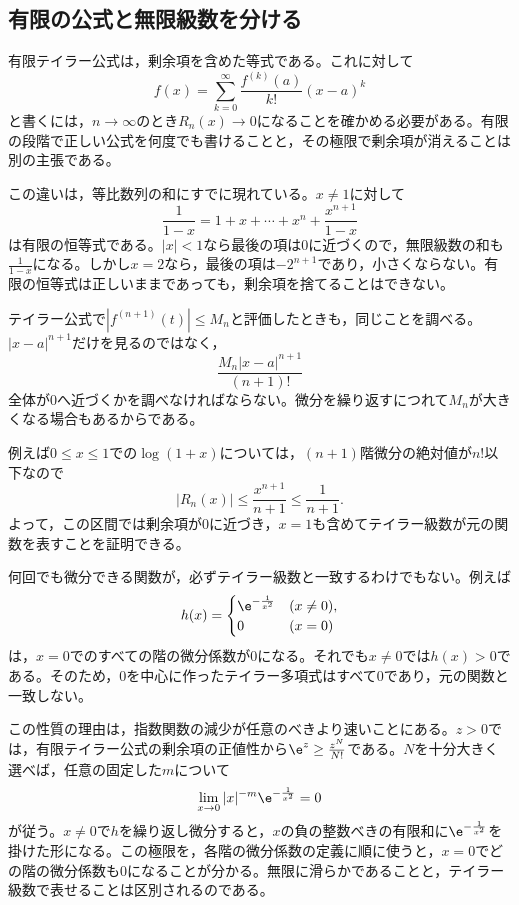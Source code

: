 \subsection{有限の公式と無限級数を分ける}

有限テイラー公式は，剰余項を含めた等式である。これに対して
\[
 f(x)=\sum_{k=0}^{\infty}\frac{f^{(k)}(a)}{k!}(x-a)^k
\]
と書くには，$n\to\infty$のとき$R_n(x)\to0$になることを確かめる必要がある。有限の段階で正しい公式を何度でも書けることと，その極限で剰余項が消えることは別の主張である。

この違いは，等比数列の和にすでに現れている。$x\ne1$に対して
\[
 \frac1{1-x}=1+x+\cdots+x^n+\frac{x^{n+1}}{1-x}
\]
は有限の恒等式である。$|x|<1$なら最後の項は$0$に近づくので，無限級数の和も$\frac1{1-x}$になる。しかし$x=2$なら，最後の項は$-2^{n+1}$であり，小さくならない。有限の恒等式は正しいままであっても，剰余項を捨てることはできない。

テイラー公式で$|f^{(n+1)}(t)|\leq M_n$と評価したときも，同じことを調べる。$|x-a|^{n+1}$だけを見るのではなく，
\[
 \frac{M_n|x-a|^{n+1}}{(n+1)!}
\]
全体が$0$へ近づくかを調べなければならない。微分を繰り返すにつれて$M_n$が大きくなる場合もあるからである。

例えば$0\leq x\leq1$での$\log(1+x)$については，$(n+1)$階微分の絶対値が$n!$以下なので
\[
 |R_n(x)|\leq\frac{x^{n+1}}{n+1}\leq\frac1{n+1}.
\]
よって，この区間では剰余項が$0$に近づき，$x=1$も含めてテイラー級数が元の関数を表すことを証明できる。

\begin{note}
何回でも微分できる関数が，必ずテイラー級数と一致するわけでもない。例えば
\[
 h(x)=
 \begin{cases}
  \e^{-\frac1{x^2}}&(x\ne0),\\
  0&(x=0)
 \end{cases}
\]
は，$x=0$でのすべての階の微分係数が$0$になる。それでも$x\ne0$では$h(x)>0$である。そのため，$0$を中心に作ったテイラー多項式はすべて$0$であり，元の関数と一致しない。

この性質の理由は，指数関数の減少が任意のべきより速いことにある。$z>0$では，有限テイラー公式の剰余項の正値性から$\e^z\geq\frac{z^N}{N!}$である。$N$を十分大きく選べば，任意の固定した$m$について
\[
 \lim_{x\to0}|x|^{-m}\e^{-\frac1{x^2}}=0
\]
が従う。$x\ne0$で$h$を繰り返し微分すると，$x$の負の整数べきの有限和に$\e^{-\frac1{x^2}}$を掛けた形になる。この極限を，各階の微分係数の定義に順に使うと，$x=0$でどの階の微分係数も$0$になることが分かる。無限に滑らかであることと，テイラー級数で表せることは区別されるのである。
\end{note}

